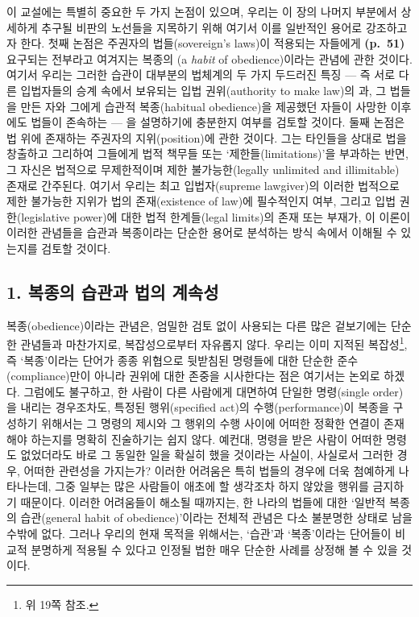 이 교설에는 특별히 중요한 두 가지 논점이 있으며, 우리는 이 장의 나머지
부분에서 상세하게 추구될 비판의 노선들을 지목하기 위해 여기서 이를
일반적인 용어로 강조하고자 한다. 첫째 논점은 주권자의 법들(sovereign's
laws)이 적용되는 자들에게 \textbf{(p.~51)} 요구되는 전부라고 여겨지는
복종의 (a \emph{habit} of obedience)이라는 관념에 관한
것이다. 여기서 우리는 그러한 습관이 대부분의 법체계의 두 가지 두드러진
특징 --- 즉 서로 다른 입법자들의 승계 속에서 보유되는 입법
권위(authority to make law)의 과, 그 법들을
만든 자와 그에게 습관적 복종(habitual obedience)을 제공했던 자들이
사망한 이후에도 법들이 존속하는  --- 을
설명하기에 충분한지 여부를 검토할 것이다. 둘째 논점은 법 위에 존재하는
주권자의 지위(position)에 관한 것이다. 그는 타인들을 상대로 법을
창출하고 그리하여 그들에게 법적 책무들 또는 ‘제한들(limitations)’을
부과하는 반면, 그 자신은 법적으로 무제한적이며 제한 불가능한(legally
unlimited and illimitable) 존재로 간주된다. 여기서 우리는 최고
입법자(supreme lawgiver)의 이러한 법적으로 제한 불가능한 지위가 법의
존재(existence of law)에 필수적인지 여부, 그리고 입법 권한(legislative
power)에 대한 법적 한계들(legal limits)의 존재 또는 부재가, 이 이론이
이러한 관념들을 습관과 복종이라는 단순한 용어로 분석하는 방식 속에서
이해될 수 있는지를 검토할 것이다.

\subsection{1. 복종의 습관과 법의
계속성}\label{uxbcf5uxc885uxc758-uxc2b5uxad00uxacfc-uxbc95uxc758-uxacc4uxc18duxc131}

복종(obedience)이라는 관념은, 엄밀한 검토 없이 사용되는 다른 많은
겉보기에는 단순한 관념들과 마찬가지로, 복잡성으로부터 자유롭지 않다.
우리는 이미 지적된 복잡성\footnote{위 19쪽 참조.}, 즉 ‘복종’이라는
단어가 종종 위협으로 뒷받침된 명령들에 대한 단순한 준수(compliance)만이
아니라 권위에 대한 존중을 시사한다는 점은 여기서는 논외로 하겠다.
그럼에도 불구하고, 한 사람이 다른 사람에게 대면하여 단일한 명령(single
order)을 내리는 경우조차도, 특정된 행위(specified act)의
수행(performance)이 복종을 구성하기 위해서는 그 명령의 제시와 그 행위의
수행 사이에 어떠한 정확한 연결이 존재해야 하는지를 명확히 진술하기는
쉽지 않다. 예컨대, 명령을 받은 사람이 어떠한 명령도 없었더라도 바로 그
동일한 일을 확실히 했을 것이라는 사실이, 사실로서 그러한 경우, 어떠한
관련성을 가지는가? 이러한 어려움은 특히 법들의 경우에 더욱 첨예하게
나타나는데, 그중 일부는 많은 사람들이 애초에 할 생각조차 하지 않았을
행위를 금지하기 때문이다. 이러한 어려움들이 해소될 때까지는, 한 나라의
법들에 대한 ‘일반적 복종의 습관(general habit of obedience)’이라는
전체적 관념은 다소 불분명한 상태로 남을 수밖에 없다. 그러나 우리의 현재
목적을 위해서는, ‘습관’과 ‘복종’이라는 단어들이 비교적 분명하게 적용될
수 있다고 인정될 법한 매우 단순한 사례를 상정해 볼 수 있을 것이다.

